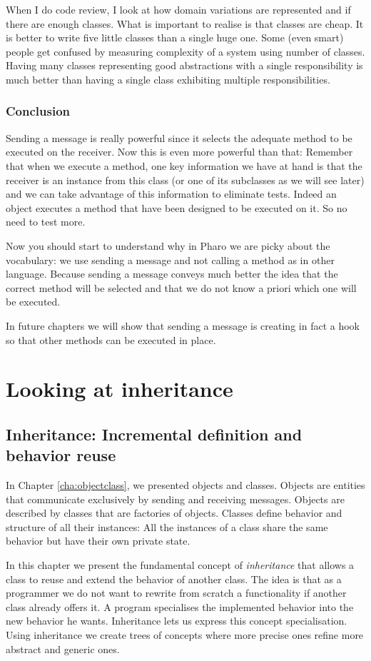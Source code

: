 \documentclass[10pt,twoside,english]{_support/latex/sbabook/sbabook}
\begin{document}
When I do code review, I look at how domain variations are represented and if there are enough classes.
What is important to realise is that classes are cheap. It is better to write five little classes than a single huge one.
Some (even smart) people get confused by measuring complexity of a system using number of classes. Having many classes 
representing good abstractions with a single responsibility is much better than having a single class exhibiting multiple responsibilities.
\section{Conclusion}
Sending a message is really powerful since it selects the adequate method to be executed on the receiver. Now this is even more powerful than that: Remember that when we execute a method, one key information we have at hand is that the receiver is an instance from this class (or one of its subclasses as we will see later) and we can take advantage of this information to eliminate tests. Indeed an object executes a method that have been designed to be executed on it. So no need to test more.

Now you should start to understand why in Pharo we are picky about the vocabulary: we use sending a message and not calling a method as in other language. Because sending a message conveys much better the idea that the correct method will be selected and that we do not know a priori which one will be executed. 

In future chapters we will show that sending a message is creating in fact a hook so that other methods can be executed in place. 
\part{Looking at inheritance}
\chapter{Inheritance: Incremental definition and behavior reuse}\label{cha:inheritance}
In Chapter \ref{cha:objectclass}, we presented objects and classes. Objects are entities that communicate exclusively by sending and receiving messages. Objects are described by classes that are factories of objects. Classes define behavior and structure of all their instances: All the instances of a class share the same behavior but have their own private state. 

In this chapter we present the fundamental concept of  \textit{inheritance} that allows a class to reuse and extend the behavior of another class. The idea is that as a programmer we do not want to rewrite from scratch a functionality if another class already offers it. A program specialises the implemented behavior into the new behavior he wants. Inheritance lets us express this concept specialisation.  Using inheritance we create trees of concepts where more precise ones refine more abstract and generic ones. 
\end{document}
